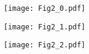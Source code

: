 \documentclass[12pt]{article}
\begin{document}
 

\begin{figure}
\begin{minipage}{8cm} 
\texttt{[image: Fig2\_0.pdf]}
\end{minipage}
\vfill
\begin{minipage}{8cm} 
\texttt{[image: Fig2\_1.pdf]}
\end{minipage}
\vfill
\begin{minipage}{8cm} 
\texttt{[image: Fig2\_2.pdf]}
\end{minipage}
\end{figure}
\end{document}
